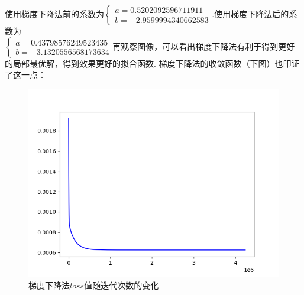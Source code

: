 \documentclass[UTF8,ctexart,a4paper,11pt,openany]{article}
\theoremstyle{definition}
\begin{document}
        使用梯度下降法前的系数为$\left\{\begin{array}{l}
            a=0.5202092596711911 \\
            b=-2.9599994340662583
            \end{array}\right.$.使用梯度下降法后的系数为\\$\left\{\begin{array}{l}
                a=0.43798576249523435 \\
                b=-3.1320556568173634
                \end{array}\right.$再观察图像，可以看出梯度下降法有利于得到更好的局部最优解，得到效果更好的拟合函数. 梯度下降法的收敛函数（下图）也印证了这一点：
            \begin{figure}[H]
                \centering
                \includegraphics[width=0.6\linewidth]{pics/P7.7.png}
                \caption{梯度下降法$loss$值随迭代次数的变化}
            \end{figure}
            
\end{document}
